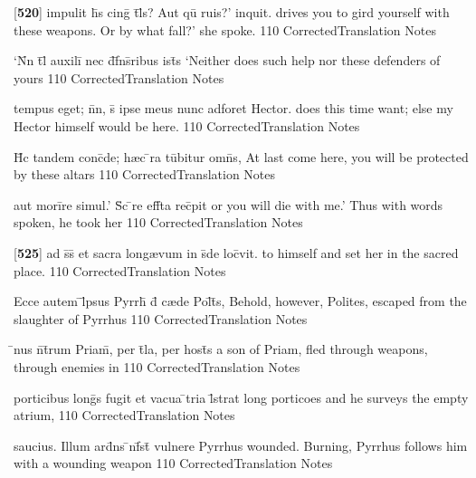 \latline
  {[\textbf{520}] impulit h\={\macron {\i}}s cing\={\macron {\i}} t\={}l\={\macron {\i}}s?  Aut qu\={} ruis?' inquit.}
  { drives you to gird yourself with these weapons.  Or by what fall?' she spoke.}
  {110}
  { CorrectedTranslation }
  { Notes }


\latline
  {`N\={}n t\={}l\={\macron {\i}} auxili\={} nec d\={}f\={}ns\={}ribus ist\={\macron {\i}}s}
  { `Neither does such help nor these defenders of yours }
  {110}
  { CorrectedTranslation }
  { Notes }


\latline
  {tempus eget; n\={}n, s\={\macron {\i}} ipse meus nunc adforet Hector.}
  { does this time want; else my Hector himself would be here. }
  {110}
  { CorrectedTranslation }
  { Notes }


\latline
  {H\={}c tandem conc\={}de; h{\ae}c \={}ra tu\={}bitur omn\={\macron {\i}}s,}
  { At last come here, you will be protected by these altars }
  {110}
  { CorrectedTranslation }
  { Notes }


\latline
  {aut mori\={}re simul.'  S\={\macron {\i}}c \={}re eff\={}ta rec\={}pit}
  { or you will die with me.'  Thus with words spoken, he took her}
  {110}
  { CorrectedTranslation }
  { Notes }


\latline
  {[\textbf{525}] ad s\={}s\={} et sacra long{\ae}vum in s\={}de loc\={}vit.}
  { to himself and set her in the sacred place. }
  {110}
  { CorrectedTranslation }
  { Notes }


\latline
  {Ecce autem \={}l\={}psus Pyrrh\={\macron {\i}} d\={} c{\ae}de Pol\={\macron {\i}}t\={}s,}
  { Behold, however, Polites, escaped from the slaughter of Pyrrhus }
  {110}
  { CorrectedTranslation }
  { Notes }


\latline
  {\={}nus n\={}t\={}rum Priam\={\macron {\i}}, per t\={}la, per host\={\macron {\i}}s}
  { a son of Priam, fled through weapons, through enemies in  }
  {110}
  { CorrectedTranslation }
  { Notes }


\latline
  {porticibus long\={\macron {\i}}s fugit et vacua \={}tria l\={}strat}
  { long porticoes and he surveys the empty atrium, }
  {110}
  { CorrectedTranslation }
  { Notes }


\latline
  {saucius.  Illum ard\={}ns \={\macron {\i}}nf\={}st\={} vulnere Pyrrhus}
  { wounded.  Burning, Pyrrhus follows him with a wounding weapon }
  {110}
  { CorrectedTranslation }
  { Notes }


